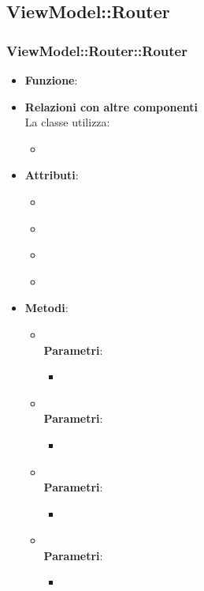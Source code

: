 \subsection{ViewModel::Router}
\subsubsection{ViewModel::Router::Router}
\begin{itemize}
\item\textbf{Funzione}:
\item\textbf{Relazioni con altre componenti}\\
La classe utilizza:
	\begin{itemize}
		\item
	\end{itemize}
\item\textbf{Attributi}:
	\begin{itemize}
		\item\code{}\\
		\item\code{}\\
		\item\code{}\\
		\item\code{}\\
	\end{itemize}
\item\textbf{Metodi}:
	\begin{itemize}
		\item\code{}\\
		\textbf{Parametri}:
			\begin{itemize}
				\item\code{}\\
			\end{itemize}
		\item\code{}\\
		\textbf{Parametri}:
			\begin{itemize}
				\item\code{}\\
			\end{itemize}
		\item\code{}\\
		\textbf{Parametri}:
			\begin{itemize}
				\item\code{}\\
			\end{itemize}
		\item\code{}\\
		\textbf{Parametri}:
			\begin{itemize}
				\item\code{}\\
			\end{itemize}
	\end{itemize}
\end{itemize}